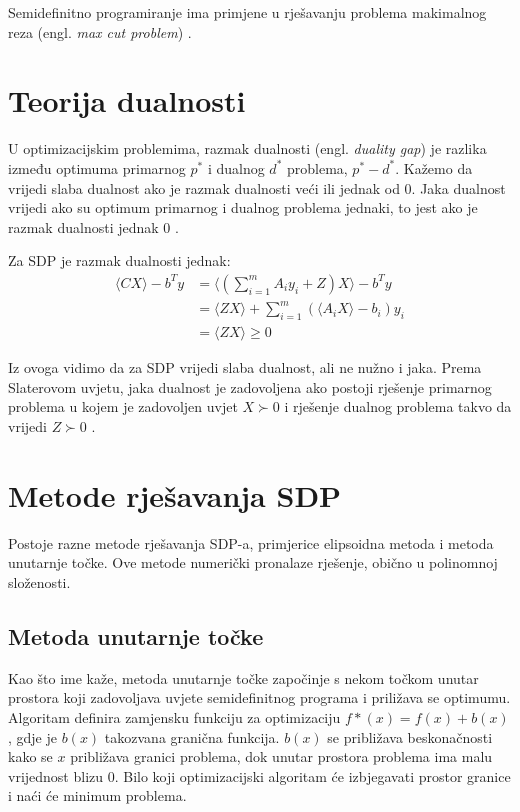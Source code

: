 \documentclass[diplomskirad]{fer}
\begin{document}
Semidefinitno programiranje ima primjene u rješavanju problema makimalnog reza (engl. \textit{max cut problem}) \cite{7804990}.

\section{Teorija dualnosti}
U optimizacijskim problemima, razmak dualnosti (engl. \textit{duality gap}) je razlika između optimuma primarnog $p^*$ i dualnog $d^*$ problema, $p^* - d^*$.
Kažemo da vrijedi slaba dualnost ako je razmak dualnosti veći ili jednak od 0. Jaka dualnost vrijedi ako su optimum primarnog i dualnog problema jednaki, to jest
ako je razmak dualnosti jednak 0 \cite{HINTERMULLER2019437}.

Za SDP je razmak dualnosti jednak:
\begin{equation}
  \begin{split}
    \langle CX \rangle - b^Ty &= \langle(\sum_{i=1}^{m}A_iy_i + Z)X \rangle - b^Ty \\
    &= \langle ZX \rangle + \sum_{i=1}^{m}(\langle A_iX \rangle - b_i) y_i \\
    &= \langle ZX \rangle \geq 0
  \end{split}
\end{equation}

Iz ovoga vidimo da za SDP vrijedi slaba dualnost, ali ne nužno i jaka. Prema Slaterovom uvjetu, jaka dualnost je zadovoljena ako postoji rješenje primarnog problema u kojem je
zadovoljen uvjet $X \succ 0$ i rješenje dualnog problema takvo da vrijedi $Z \succ 0$ \cite{slater}.

\section{Metode rješavanja SDP}
Postoje razne metode rješavanja SDP-a, primjerice elipsoidna metoda i metoda unutarnje točke. Ove metode numerički pronalaze rješenje, obično u polinomnoj složenosti.

\subsection{Metoda unutarnje točke}
Kao što ime kaže, metoda unutarnje točke započinje s nekom točkom unutar prostora koji zadovoljava uvjete semidefinitnog programa i priližava se optimumu.
Algoritam definira zamjensku funkciju za optimizaciju $f*(x) = f(x) + b(x)$, gdje je $b(x)$ takozvana granična funkcija. $b(x)$ se približava beskonačnosti kako se
$x$ približava granici problema, dok unutar prostora problema ima malu vrijednost blizu 0. Bilo koji optimizacijski algoritam će izbjegavati prostor granice i naći će minimum problema.
\end{document}

